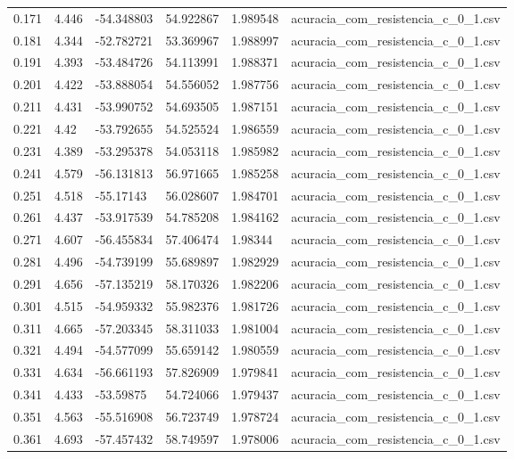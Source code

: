 \begin{table}
\begin{tabular}{llllll}
0.171 & 4.446 & -54.348803 & 54.922867 & 1.989548 & acuracia\_com\_resistencia\_c\_0\_1.csv \\
0.181 & 4.344 & -52.782721 & 53.369967 & 1.988997 & acuracia\_com\_resistencia\_c\_0\_1.csv \\
0.191 & 4.393 & -53.484726 & 54.113991 & 1.988371 & acuracia\_com\_resistencia\_c\_0\_1.csv \\
0.201 & 4.422 & -53.888054 & 54.556052 & 1.987756 & acuracia\_com\_resistencia\_c\_0\_1.csv \\
0.211 & 4.431 & -53.990752 & 54.693505 & 1.987151 & acuracia\_com\_resistencia\_c\_0\_1.csv \\
0.221 & 4.42 & -53.792655 & 54.525524 & 1.986559 & acuracia\_com\_resistencia\_c\_0\_1.csv \\
0.231 & 4.389 & -53.295378 & 54.053118 & 1.985982 & acuracia\_com\_resistencia\_c\_0\_1.csv \\
0.241 & 4.579 & -56.131813 & 56.971665 & 1.985258 & acuracia\_com\_resistencia\_c\_0\_1.csv \\
0.251 & 4.518 & -55.17143 & 56.028607 & 1.984701 & acuracia\_com\_resistencia\_c\_0\_1.csv \\
0.261 & 4.437 & -53.917539 & 54.785208 & 1.984162 & acuracia\_com\_resistencia\_c\_0\_1.csv \\
0.271 & 4.607 & -56.455834 & 57.406474 & 1.98344 & acuracia\_com\_resistencia\_c\_0\_1.csv \\
0.281 & 4.496 & -54.739199 & 55.689897 & 1.982929 & acuracia\_com\_resistencia\_c\_0\_1.csv \\
0.291 & 4.656 & -57.135219 & 58.170326 & 1.982206 & acuracia\_com\_resistencia\_c\_0\_1.csv \\
0.301 & 4.515 & -54.959332 & 55.982376 & 1.981726 & acuracia\_com\_resistencia\_c\_0\_1.csv \\
0.311 & 4.665 & -57.203345 & 58.311033 & 1.981004 & acuracia\_com\_resistencia\_c\_0\_1.csv \\
0.321 & 4.494 & -54.577099 & 55.659142 & 1.980559 & acuracia\_com\_resistencia\_c\_0\_1.csv \\
0.331 & 4.634 & -56.661193 & 57.826909 & 1.979841 & acuracia\_com\_resistencia\_c\_0\_1.csv \\
0.341 & 4.433 & -53.59875 & 54.724066 & 1.979437 & acuracia\_com\_resistencia\_c\_0\_1.csv \\
0.351 & 4.563 & -55.516908 & 56.723749 & 1.978724 & acuracia\_com\_resistencia\_c\_0\_1.csv \\
0.361 & 4.693 & -57.457432 & 58.749597 & 1.978006 & acuracia\_com\_resistencia\_c\_0\_1.csv \\

\end{tabular}
\end{table}

